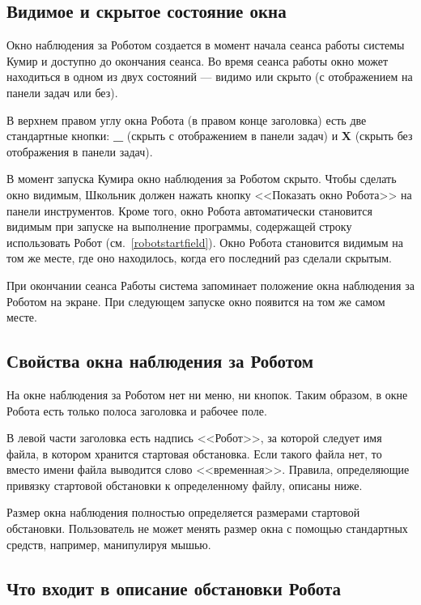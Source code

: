 \subsection{Видимое и скрытое состояние окна}

Окно наблюдения за Роботом создается в момент начала сеанса работы системы Кумир и доступно до окончания сеанса. Во время сеанса работы окно может находиться в одном из двух состояний --- видимо или скрыто (с отображением на панели задач или без).

В верхнем  правом углу окна Робота (в правом конце заголовка) есть две стандартные кнопки: \textbf{\_} (скрыть с отображением в панели задач) и \textbf{X} (скрыть без отображения в панели задач).

В момент запуска Кумира окно наблюдения за Роботом скрыто. Чтобы сделать окно видимым, Школьник должен нажать кнопку <<Показать окно Робота>> на панели инструментов. Кроме того, окно Робота автоматически становится видимым  при запуске на выполнение программы, содержащей строку \textsf{использовать Робот} (см.~\ref{robotstartfield}). Окно Робота становится видимым на том же месте, где оно находилось, когда его последний раз сделали скрытым.

При окончании сеанса Работы система запоминает положение окна наблюдения за Роботом на экране. При следующем запуске окно появится на том же самом месте.
	
\subsection{Свойства окна наблюдения за Роботом}

На окне наблюдения за Роботом нет ни меню, ни кнопок. Таким образом, в окне Робота есть только полоса заголовка и рабочее поле.

В левой части заголовка есть надпись <<Робот>>, за которой следует имя файла, в котором хранится стартовая обстановка. Если такого файла нет, то вместо имени файла выводится слово <<временная>>.  Правила, определяющие привязку стартовой обстановки к определенному файлу, описаны ниже.

Размер окна наблюдения полностью определяется размерами стартовой обстановки. Пользователь не может менять размер окна с помощью стандартных средств, например, манипулируя мышью.

\subsection{Что входит в описание обстановки Робота}

